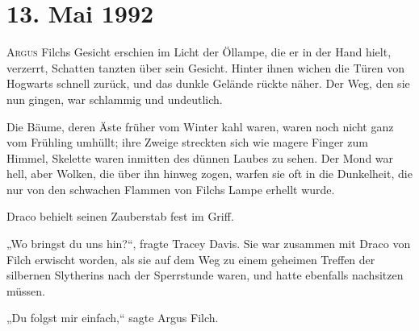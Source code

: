 
\section{13. Mai 1992}

\lettrine{A}{rgus} Filchs Gesicht erschien im Licht der Öllampe, die er in der Hand hielt, verzerrt, Schatten tanzten über sein Gesicht. Hinter ihnen wichen die Türen von Hogwarts schnell zurück, und das dunkle Gelände rückte näher. Der Weg, den sie nun gingen, war schlammig und undeutlich.

Die Bäume, deren Äste früher vom Winter kahl waren, waren noch nicht ganz vom Frühling umhüllt; ihre Zweige streckten sich wie magere Finger zum Himmel, Skelette waren inmitten des dünnen Laubes zu sehen. Der Mond war hell, aber Wolken, die über ihn hinweg zogen, warfen sie oft in die Dunkelheit, die nur von den schwachen Flammen von Filchs Lampe erhellt wurde.

Draco behielt seinen Zauberstab fest im Griff.

„Wo bringst du uns hin?“, fragte Tracey Davis. Sie war zusammen mit Draco von Filch erwischt worden, als sie auf dem Weg zu einem geheimen Treffen der silbernen Slytherins nach der Sperrstunde waren, und hatte ebenfalls nachsitzen müssen.

„Du folgst mir einfach,“ sagte Argus Filch.

